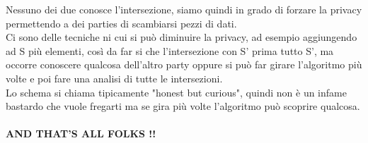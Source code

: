 \documentclass[12pt, oneside]{extbook} %
\begin{document}
Nessuno dei due conosce l'intersezione, siamo quindi in grado di forzare la privacy permettendo a dei parties di scambiarsi pezzi di dati.\\Ci sono delle tecniche ni cui si può diminuire la privacy, ad esempio aggiungendo ad S più elementi, così da far si che l'intersezione con S' prima tutto S', ma occorre conoscere qualcosa dell'altro party oppure si può far girare l'algoritmo più volte e poi fare una analisi di tutte le intersezioni.\\Lo schema si chiama tipicamente "honest but curious", quindi non è un infame bastardo che vuole fregarti ma se gira più volte l'algoritmo può scoprire qualcosa.\\\\
\Huge
\textbf{\textsf{AND THAT'S ALL FOLKS !!}}
\end{document}
